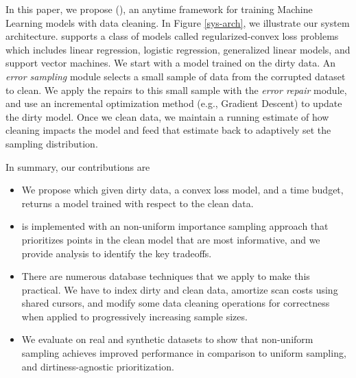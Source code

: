 In this paper, we propose \sysfull (\sys), an anytime framework for training Machine Learning models with data cleaning.
In Figure \ref{sys-arch}, we illustrate our system architecture.
\sys supports a class of models called regularized-convex loss problems which includes linear regression, logistic regression, generalized linear models, and support vector machines.
We start with a model trained on the dirty data.
An \emph{error sampling} module selects a small sample of data from the corrupted dataset to clean.
We apply the repairs to this small sample with the \emph{error repair} module, and use an incremental optimization method (e.g., Gradient Descent) to update the dirty model.
Once we clean data, we maintain a running estimate of how cleaning impacts the model and feed that estimate back to adaptively set the sampling distribution.

In summary, our contributions are
\begin{itemize}[noitemsep]
\item We propose \sysfull which given dirty data, a convex loss model, and a time budget, returns a model trained with respect to the clean data.
\item \sysfull is implemented with an non-uniform importance sampling approach that prioritizes points in the clean model that are most informative, and we provide analysis to identify the key tradeoffs.
\item There are numerous database techniques that we apply to make this practical. We have to index dirty and clean data, amortize scan costs using shared cursors, and modify some data cleaning operations for correctness when applied to progressively increasing sample sizes.
\item We evaluate \sysfull on real and synthetic datasets to show that non-uniform sampling achieves improved performance in comparison to uniform sampling, and dirtiness-agnostic prioritization.
\end{itemize}








